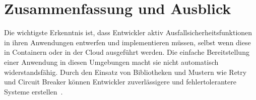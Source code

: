\section{Zusammenfassung und Ausblick}


Die wichtigste Erkenntnis ist, dass Entwickler aktiv Ausfallsicherheitsfunktionen
in ihren Anwendungen entwerfen und implementieren müssen, selbst wenn diese in Containern oder in der Cloud ausgeführt werden.
Die einfache Bereitstellung einer Anwendung in diesen Umgebungen macht sie nicht automatisch widerstandsfähig.
Durch den Einsatz von Bibliotheken und Mustern wie Retry und Circuit Breaker können Entwickler zuverlässigere und
fehlertolerantere Systeme erstellen~\cite{Haley.28.06.2018}.
